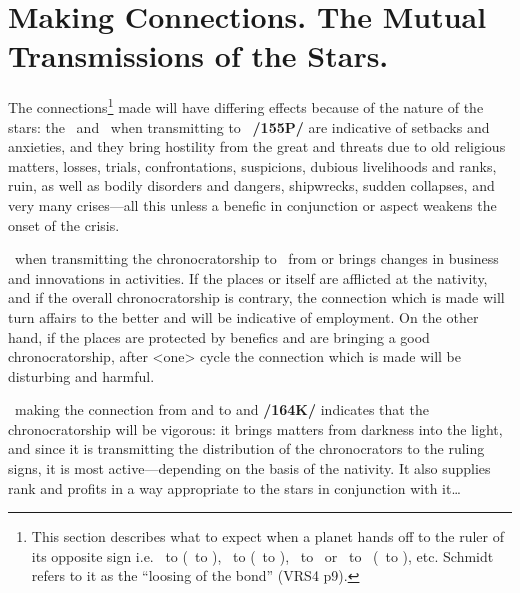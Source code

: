 \section{Making Connections. The Mutual Transmissions of the Stars.}

The connections\footnote{This section describes what to expect when a planet hands off to the ruler of its opposite sign i.e. \Leo\, to \Aquarius (\Sun\, to \Saturn), \Cancer\, to \Capricorn (\Moon\, to \Saturn), \Gemini\, to \Sagittarius\, or \Virgo\, to \Pisces\, (\Mercury\, to \Jupiter), etc. Schmidt refers to it as the ``loosing of the bond'' (VRS4 p9).} made will have differing effects because of the nature of the stars: the \Sun\, and \Moon\, when transmitting to \Saturn\, \textbf{/155P/} are indicative of setbacks and anxieties, and they bring hostility from
the great and threats due to old religious matters, losses, trials, confrontations, suspicions, dubious livelihoods and ranks, ruin, as well as bodily disorders and dangers, shipwrecks, sudden collapses, and very many crises—all this unless a benefic in conjunction or aspect weakens the onset of the crisis.

\Mercury\, when transmitting the chronocratorship to \Jupiter\, from \Virgo\xspace or \Gemini\xspace brings changes in business and innovations in activities. If the places or \Mercury\xspace itself are afflicted at the nativity, and if the overall chronocratorship is contrary, the connection which is made will turn affairs to the better and will be
indicative of employment. On the other hand, if the places are protected by benefics and are bringing a good chronocratorship, after <one> cycle the connection which is made will be disturbing and harmful.

\Saturn\, making the connection from \Capricorn\xspace and \Aquarius\xspace to \Leo\xspace and \Cancer\xspace \textbf{/164K/} indicates that the chronocratorship will be vigorous: it brings matters from darkness into the light, and since it is
transmitting the distribution of the chronocrators to the ruling signs, it is most active—depending on the basis of the nativity. It also supplies rank and profits in a way appropriate to the stars in conjunction with it\ldots

\newpage
